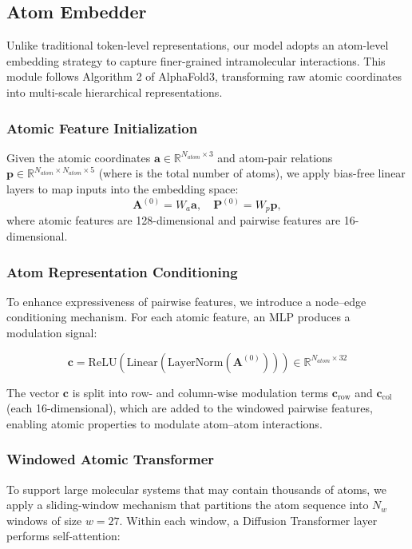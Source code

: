 \subsection{Atom Embedder}


Unlike traditional token-level representations, our model adopts an atom-level embedding strategy to capture finer-grained intramolecular interactions. This module follows Algorithm 2 of AlphaFold3, transforming raw atomic coordinates into multi-scale hierarchical representations.

  
\subsubsection{Atomic Feature Initialization}

Given the atomic coordinates $\mathbf{a} \in \mathbb{R}^{N_{atom} \times 3}$ and atom-pair relations $\mathbf{p} \in \mathbb{R}^{N_{atom} \times N_{atom} \times 5}$ (where  is the total number of atoms), we apply bias-free linear layers to map inputs into the embedding space: $$\mathbf{A}^{(0)} = W_a \mathbf{a},\quad \mathbf{P}^{(0)} = W_p \mathbf{p},$$
where atomic features are 128-dimensional and pairwise features are 16-dimensional.

  
\subsubsection{Atom Representation Conditioning}
To enhance expressiveness of pairwise features, we introduce a node–edge conditioning mechanism. For each atomic feature, an MLP produces a modulation signal:

$$\mathbf{c} = \text{ReLU}\left(\text{Linear}\left(\text{LayerNorm}(\mathbf{A}^{(0)})\right)\right) \in \mathbb{R}^{N_{atom} \times 32}$$

The vector $\mathbf{c}$ is split into row- and column-wise modulation terms $\mathbf{c}_{\text{row}}$ and $\mathbf{c}_{\text{col}}$ (each 16-dimensional), which are added to the windowed pairwise features, enabling atomic properties to modulate atom–atom interactions.

  
\subsubsection{Windowed Atomic Transformer}

To support large molecular systems that may contain thousands of atoms, we apply a sliding-window mechanism that partitions the atom sequence into $N_w$ windows of size $w = 27$. Within each window, a Diffusion Transformer layer performs self-attention:

